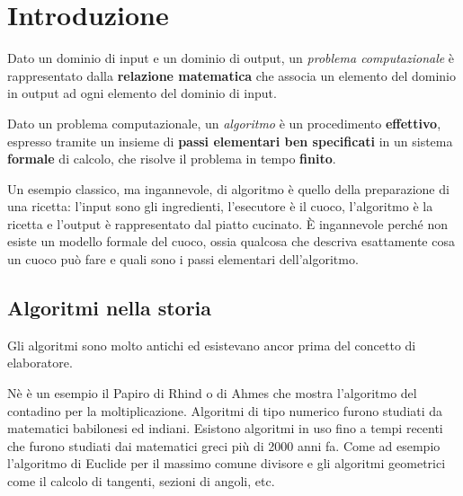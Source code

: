 
\ifsubfile
\usepackage{../settings/subfile}
\setcounter{chapter}{0}


\fi
\chapter{Introduzione}

\begin{definition}
Dato un dominio di input e un dominio di output, un \emph{problema computazionale} è rappresentato dalla \textbf{relazione matematica} che associa un elemento del dominio in output ad ogni elemento del dominio di input.
\end{definition}

\begin{definition}[algoritmo]
Dato un problema computazionale, un \emph{algoritmo} è un procedimento \textbf{effettivo}, espresso tramite un insieme di \textbf{passi elementari ben specificati} in un sistema \textbf{formale} di calcolo, che risolve il problema in tempo \textbf{finito}.
\end{definition}

Un esempio classico, ma ingannevole, di algoritmo è quello della preparazione di una ricetta: l'input sono gli ingredienti, l'esecutore è il cuoco, l'algoritmo è la ricetta e l'output è rappresentato dal piatto cucinato.
\`E ingannevole perché non esiste un modello formale del cuoco, ossia qualcosa che descriva esattamente cosa un cuoco può fare e quali sono i passi elementari dell'algoritmo.

\section*{Algoritmi nella storia}

Gli algoritmi sono molto antichi ed esistevano ancor prima del concetto di elaboratore.

Nè è un esempio il Papiro di Rhind o di Ahmes che mostra l'algoritmo del contadino per la moltiplicazione.
Algoritmi di tipo numerico furono studiati da matematici babilonesi ed indiani.
Esistono algoritmi in uso fino a tempi recenti che furono studiati dai matematici greci più di 2000 anni fa.
Come ad esempio l'algoritmo di Euclide per il massimo comune divisore e gli algoritmi geometrici come il calcolo di tangenti, sezioni di angoli, etc.\

